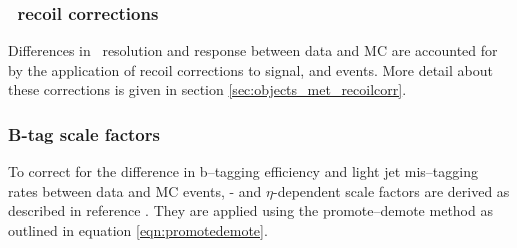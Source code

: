 \subsubsection*{\MET~recoil corrections}
Differences in \MET~resolution and response between data and \ac{MC} 
are accounted for by the application of recoil corrections
to signal, \Wjets and \Ztautau events. More detail
about these corrections is given in section \ref{sec:objects_met_recoilcorr}.
\subsubsection*{B-tag scale factors}
To correct for the difference in b--tagging efficiency
and light jet mis--tagging rates between data and \ac{MC} events,
\pT- and $\eta$-dependent scale factors are derived as 
described in reference \cite{cms-btag-run2}. They 
are applied using the promote--demote method
as outlined in equation \ref{eqn:promotedemote}.
